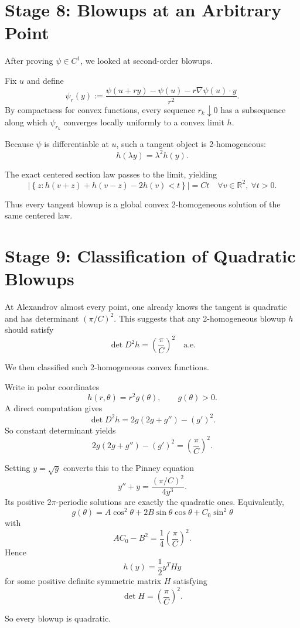 \documentclass[11pt]{article}
\begin{document}
\section*{Stage 8: Blowups at an Arbitrary Point}

After proving $\psi\in C^1$, we looked at second-order blowups.

Fix $u$ and define
\[
\psi_r(y):=\frac{\psi(u+ry)-\psi(u)-r\nabla\psi(u)\cdot y}{r^2}.
\]
By compactness for convex functions, every sequence $r_k\downarrow 0$ has a subsequence along which $\psi_{r_k}$ converges locally uniformly to a convex limit $h$.

Because $\psi$ is differentiable at $u$, such a tangent object is 2-homogeneous:
\[
h(\lambda y)=\lambda^2 h(y).
\]

The exact centered section law passes to the limit, yielding
\[
\left|\left\{z: h(v+z)+h(v-z)-2h(v)<t\right\}\right|=Ct
\quad \forall v\in\mathbb{R}^2,\ \forall t>0.
\tag{3}
\]

Thus every tangent blowup is a global convex 2-homogeneous solution of the same centered law.

\section*{Stage 9: Classification of Quadratic Blowups}

At Alexandrov almost every point, one already knows the tangent is quadratic and has determinant $(\pi/C)^2$. This suggests that any 2-homogeneous blowup $h$ should satisfy
\[
\det D^2 h = \left(\frac{\pi}{C}\right)^2
\quad\text{a.e.}
\]

We then classified such 2-homogeneous convex functions.

Write in polar coordinates
\[
h(r,\theta)=r^2 g(\theta),
\qquad g(\theta)>0.
\]
A direct computation gives
\[
\det D^2 h = 2g(2g+g'')-(g')^2.
\]
So constant determinant yields
\[
2g(2g+g'')-(g')^2 = \left(\frac{\pi}{C}\right)^2.
\tag{4}
\]

Setting $y=\sqrt{g}$ converts this to the Pinney equation
\[
y''+y=\frac{(\pi/C)^2}{4y^3}.
\]
Its positive $2\pi$-periodic solutions are exactly the quadratic ones. Equivalently,
\[
g(\theta)=A\cos^2\theta+2B\sin\theta\cos\theta+C_0\sin^2\theta
\]
with
\[
AC_0-B^2=\frac14\left(\frac{\pi}{C}\right)^2.
\]
Hence
\[
h(y)=\frac12 y^T H y
\]
for some positive definite symmetric matrix $H$ satisfying
\[
\det H = \left(\frac{\pi}{C}\right)^2.
\]

So every blowup is quadratic.
\end{document}
